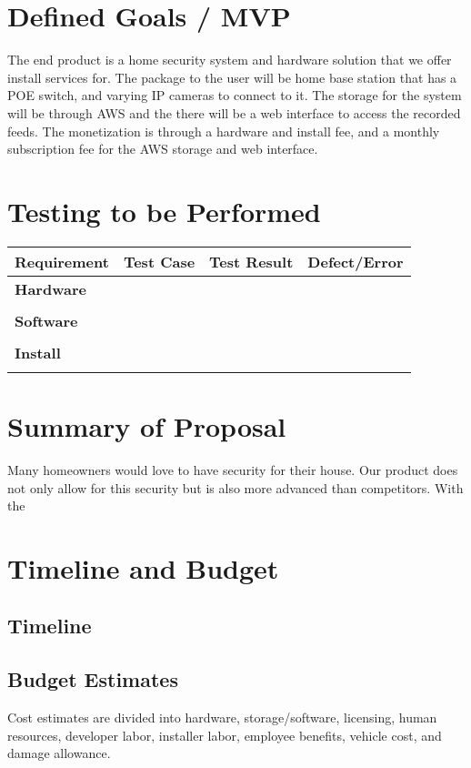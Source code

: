 \documentclass{report}
\begin{document}
\chapter{Defined Goals / MVP}
The end product is a home security system and hardware solution that we offer install services for. 
The package to the user will be home base station that has a POE switch, and varying IP cameras to connect to it. 
The storage for the system will be through AWS and the there will be a web interface to access the recorded feeds. 
The monetization is through a hardware and install fee, and a monthly subscription fee for the AWS storage and web interface. 


\chapter{Testing to be Performed}
\begin{tabular}{|l|l|l|l|}
\hline
\textbf{Requirement} & \textbf{Test Case} & \textbf{Test Result} & \textbf{Defect/Error}\\
\hline
\textbf{Hardware} &  &  &  \\
\hline
 &  &  &  \\
\hline
\textbf{Software} &  &  &  \\
\hline
 &  &  &  \\
\hline
\textbf{Install} &  &  &  \\
\hline
 &  &  &  \\
\hline
\end{tabular}

\chapter{Summary of Proposal}
Many homeowners would love to have security for their house. 
Our product does not only allow for this security but is also more advanced than competitors.
With the 


\chapter{Timeline and Budget}
\section{Timeline}

\section{Budget Estimates}
Cost estimates are divided into hardware, 
storage/software, licensing, human resources,
developer labor, installer labor, employee benefits, 
vehicle cost, and damage allowance.
\end{document}
